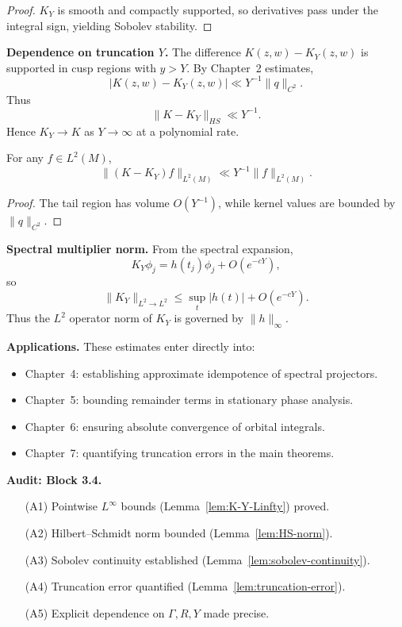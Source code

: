 \begin{proof}
$K_{Y}$ is smooth and compactly supported,
so derivatives pass under the integral sign,
yielding Sobolev stability.
\end{proof}

\medskip

\noindent\textbf{Dependence on truncation $Y$.}
The difference $K(z,w)-K_{Y}(z,w)$ is supported in cusp regions with $y>Y$.
By Chapter~2 estimates,
\[
  |K(z,w)-K_{Y}(z,w)| \ll Y^{-1}\|q\|_{C^{2}}.
\]
Thus
\[
  \|K-K_{Y}\|_{HS} \ll Y^{-1}.
\]
Hence $K_{Y}\to K$ as $Y\to\infty$ at a polynomial rate.

\medskip

\begin{lemma}\label{lem:truncation-error}
For any $f\in L^{2}(M)$,
\[
  \|(K-K_{Y})f\|_{L^{2}(M)} \ll Y^{-1}\|f\|_{L^{2}(M)}.
\]
\end{lemma}

\begin{proof}
The tail region has volume $O(Y^{-1})$,
while kernel values are bounded by $\|q\|_{C^{2}}$.
\end{proof}

\medskip

\noindent\textbf{Spectral multiplier norm.}
From the spectral expansion,
\[
  K_{Y}\phi_{j} = h(t_{j})\phi_{j} + O(e^{-cY}),
\]
so
\[
  \|K_{Y}\|_{L^{2}\to L^{2}} \le \sup_{t}|h(t)| + O(e^{-cY}).
\]
Thus the $L^{2}$ operator norm of $K_{Y}$ is governed by $\|h\|_{\infty}$.

\medskip

\noindent\textbf{Applications.}
These estimates enter directly into:
\begin{itemize}
  \item Chapter~4: establishing approximate idempotence of spectral projectors.
  \item Chapter~5: bounding remainder terms in stationary phase analysis.
  \item Chapter~6: ensuring absolute convergence of orbital integrals.
  \item Chapter~7: quantifying truncation errors in the main theorems.
\end{itemize}

\medskip

\noindent\textbf{Audit: Block 3.4.}
\begin{itemize}
  \item[(A1)] Pointwise $L^{\infty}$ bounds (Lemma~\ref{lem:K-Y-Linfty}) proved. 
  \item[(A2)] Hilbert–Schmidt norm bounded (Lemma~\ref{lem:HS-norm}). 
  \item[(A3)] Sobolev continuity established (Lemma~\ref{lem:sobolev-continuity}). 
  \item[(A4)] Truncation error quantified (Lemma~\ref{lem:truncation-error}). 
  \item[(A5)] Explicit dependence on $\Gamma,R,Y$ made precise. 
\end{itemize}

